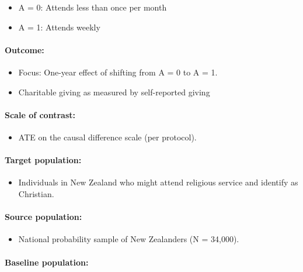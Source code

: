 \documentclass[
  singlecolumn]{article}
\let\oldparagraph\paragraph
\renewcommand{\paragraph}[1]{\oldparagraph{#1}\mbox{}}
\providecommand{\tightlist}{%
  \setlength{\itemsep}{0pt}\setlength{\parskip}{0pt}}\usepackage{longtable,booktabs,array}
\begin{document}
\begin{itemize}
\tightlist
\item
  A = 0: Attends less than once per month
\item
  A = 1: Attends weekly
\end{itemize}

\paragraph{Outcome:}\label{outcome}

\begin{itemize}
\tightlist
\item
  Focus: One-year effect of shifting from A = 0 to A = 1.
\item
  Charitable giving as measured by self-reported giving
\end{itemize}

\paragraph{Scale of contrast:}\label{scale-of-contrast}

\begin{itemize}
\tightlist
\item
  ATE on the causal difference scale (per protocol).
\end{itemize}

\paragraph{Target population:}\label{target-population}

\begin{itemize}
\tightlist
\item
  Individuals in New Zealand who might attend religious service and
  identify as Christian.
\end{itemize}

\paragraph{Source population:}\label{source-population}

\begin{itemize}
\tightlist
\item
  National probability sample of New Zealanders (N = 34,000).
\end{itemize}

\paragraph{Baseline population:}\label{baseline-population}
\end{document}
